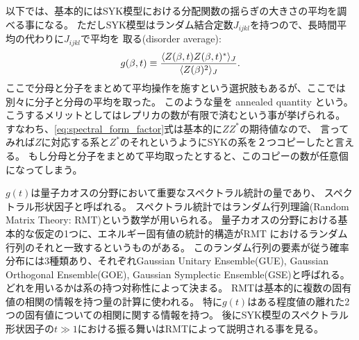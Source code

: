 以下では、基本的にはSYK模型における分配関数の揺らぎの大きさの平均を調べる事になる。
ただしSYK模型はランダム結合定数$J_{ijkl}$を持つので、長時間平均の代わりに$J_{ijkl}$で平均を
取る(disorder average):
\begin{align}
	g(\beta, t) \equiv
	\frac{\langle Z(\beta, t)Z(\beta, t)^* \rangle_J}{\langle Z(\beta)^2 \rangle_J}.
	\label{eq:spectral_form_factor}
\end{align}
ここで分母と分子をまとめて平均操作を施すという選択肢もあるが、ここでは別々に分子と分母の平均を取った。
このような量を annealed quantity という。
こうするメリットとしてはレプリカの数が有限で済むという事が挙げられる。
すなわち、\eqref{eq:spectral_form_factor}式は基本的に$ZZ^*$の期待値なので、
言ってみれば$Z$に対応する系と$Z^*$のそれというようにSYKの系を２つコピーしたと言える。
もし分母と分子をまとめて平均取ったとすると、このコピーの数が任意個になってしまう。

$g(t)$は量子カオスの分野において重要なスペクトラル統計の量であり、
スペクトラル形状因子と呼ばれる。
スペクトラル統計ではランダム行列理論(Random Matrix Theory: RMT)という数学が用いられる。
量子カオスの分野における基本的な仮定の1つに、エネルギー固有値の統計的構造がRMT
におけるランダム行列のそれと一致するというものがある。
このランダム行列の要素が従う確率分布には3種類あり、それぞれGaussian Unitary Ensemble(GUE),
Gaussian Orthogonal Ensemble(GOE), Gaussian Symplectic Ensemble(GSE)と呼ばれる。
どれを用いるかは系の持つ対称性によって決まる。
RMTは基本的に複数の固有値の相関の情報を持つ量の計算に使われる。
特に$g(t)$はある程度値の離れた2つの固有値についての相関に関する情報を持つ。
後にSYK模型のスペクトラル形状因子の$t \gg 1$における振る舞いはRMTによって説明される事を見る。

